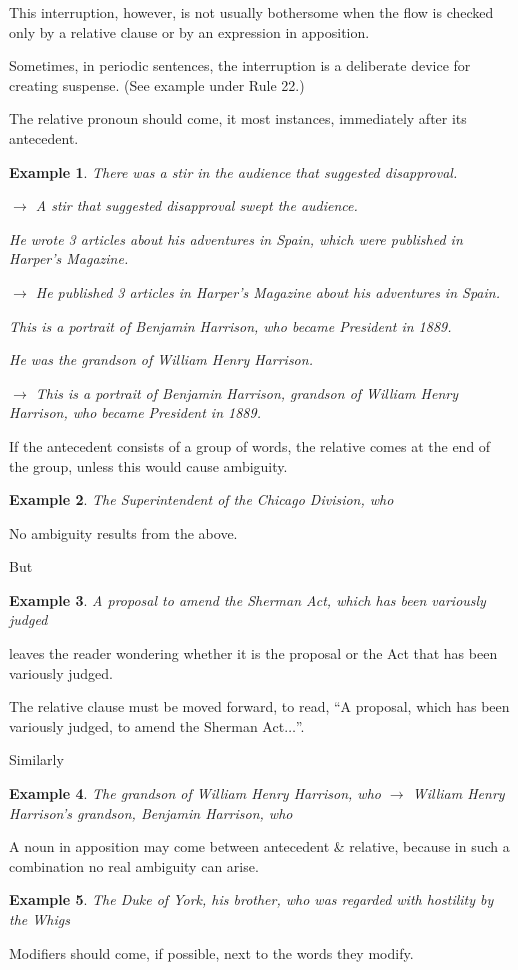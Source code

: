 \documentclass{article}
\newtheorem{example}{Example}
\begin{document}
This interruption, however, is not usually bothersome when the flow is checked only by a relative clause or by an expression in apposition.

Sometimes, in periodic sentences, the interruption is a deliberate device for creating suspense. (See example under Rule 22.)

%
The relative pronoun should come, it most instances, immediately after its antecedent.
\begin{example}
	There was a stir in the audience that suggested disapproval.
	
	$\to$ A stir that suggested disapproval swept the audience.
	
	He wrote 3 articles about his adventures in Spain, which were published in \emph{Harper's Magazine}.
	
	$\to$ He published 3 articles in \emph{Harper's Magazine} about his adventures in Spain.
	
	This is a portrait of Benjamin Harrison, who became President in 1889.
	
	He was the grandson of William Henry Harrison.
	
	$\to$ This is a portrait of Benjamin Harrison, grandson of William Henry Harrison, who became President in 1889.
\end{example}
If the antecedent consists of a group of words, the relative comes at the end of the group, unless this would cause ambiguity.
\begin{example}
	The Superintendent of the Chicago Division, who
\end{example}
No ambiguity results from the above.

But
\begin{example}
	A proposal to amend the Sherman Act, which has been variously judged
\end{example}
leaves the reader wondering whether it is the proposal or the Act that has been variously judged.

The relative clause must be moved forward, to read, ``A proposal, which has been variously judged, to amend the Sherman Act$\ldots$''.

Similarly
\begin{example}
	The grandson of William Henry Harrison, who $\to$ William Henry Harrison's grandson, Benjamin Harrison, who
\end{example}
A noun in apposition may come between antecedent \& relative, because in such a combination no real ambiguity can arise.
\begin{example}
	The Duke of York, his brother, who was regarded with hostility by the Whigs
\end{example}
Modifiers should come, if possible, next to the words they modify.
\end{document}
